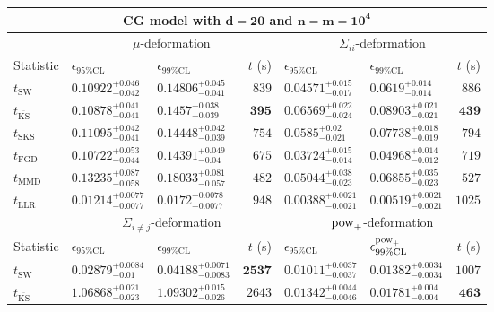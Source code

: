 \begin{tabular}{l|llr|llr}
	\toprule
	\multicolumn{7}{c}{{\bf CG model with $\mathbf{d=20}$ and $\mathbf{n=m=10^{4}}$}} \\
	\toprule
	\multicolumn{1}{c}{} & \multicolumn{3}{c}{$\mu$-deformation} & \multicolumn{3}{c}{$\Sigma_{ii}$-deformation} \\
	Statistic & $\epsilon_{95\%\mathrm{CL}}$ & $\epsilon_{99\%\mathrm    {CL}}$ & $t$ (s) & $\epsilon_{95\%\mathrm{CL}}$ & $\epsilon_{99\%\mathrm{CL}}$ & $t$ (s) \\
	\midrule
	$t_{\mathrm{SW}}$ & $0.10922_{-0.042}^{+0.046}$ & $0.14806_{-0.041}^{+0.045}$ & $839$ & $0.04571_{-0.017}^{+0.015}$ & $0.0619_{-0.014}^{+0.014}$ & $886$ \\
	$t_{\overline{\mathrm{KS}}}$ & $0.10878_{-0.041}^{+0.041}$ & $0.1457_{-0.039}^{+0.038}$ & ${\mathbf{395}}$ & $0.06569_{-0.024}^{+0.022}$ & $0.08903_{-0.021}^{+0.021}$ & ${\mathbf{439}}$ \\
	$t_{\mathrm{SKS}}$ & $0.11095_{-0.041}^{+0.042}$ & $0.14448_{-0.039}^{+0.042}$ & $754$ & $0.0585_{-0.021}^{+0.02}$ & $0.07738_{-0.019}^{+0.018}$ & $794$ \\
	$t_{\mathrm{FGD}}$ & ${\mathbf{0.10722_{-0.044}^{+0.053}}}$ & ${\mathbf{0.14391_{-0.04}^{+0.049}}}$ & $675$ & ${\mathbf{0.03724_{-0.014}^{+0.015}}}$ & ${\mathbf{0.04968_{-0.012}^{+0.014}}}$ & $719$ \\
	$t_{\mathrm{MMD}}$ & $0.13235_{-0.058}^{+0.087}$ & $0.18033_{-0.057}^{+0.081}$ & $482$ & $0.05044_{-0.023}^{+0.038}$ & $0.06855_{-0.023}^{+0.035}$ & $527$ \\
	$t_{\mathrm{LLR}}$ & $0.01214_{-0.0077}^{+0.0077}$ & $0.0172_{-0.0077}^{+0.0078}$ & $948$ & $0.00388_{-0.0021}^{+0.0021}$ & $0.00519_{-0.0021}^{+0.0021}$ & $1025$ \\
	\toprule
	\multicolumn{1}{c}{} & \multicolumn{3}{c}{$\Sigma_{i\neq j}$-deformation} & \multicolumn{3}{c}{$\rm{pow}_{+}$-deformation} \\
	Statistic & $\epsilon_{95\%\mathrm{CL}}$ & $\epsilon_{99\%\mathrm{CL}}$ & $t$ (s) & $\epsilon_{95\%\mathrm{CL}}$ & $\epsilon^{\rm   {pow}_{+}}_{99\%\mathrm{CL}}$ & $t$ (s) \\
	\midrule
	$t_{\mathrm{SW}}$ & $0.02879_{-0.01}^{+0.0084}$ & $0.04188_{-0.0083}^{+0.0071}$ & ${\mathbf{2537}}$ & $0.01011_{-0.0037}^{+0.0037}$ & $0.01382_{-0.0034}^{+0.0034}$ & $1007$ \\
	$t_{\overline{\mathrm{KS}}}$ & $1.06868_{-0.023}^{+0.021}$ & $1.09302_{-0.026}^{+0.015}$ & $2643$ & $0.01342_{-0.0046}^{+0.0044}$ & $0.01781_{-0.004}^{+0.004}$ & ${\mathbf{463}}$ \\

\end{tabular}

